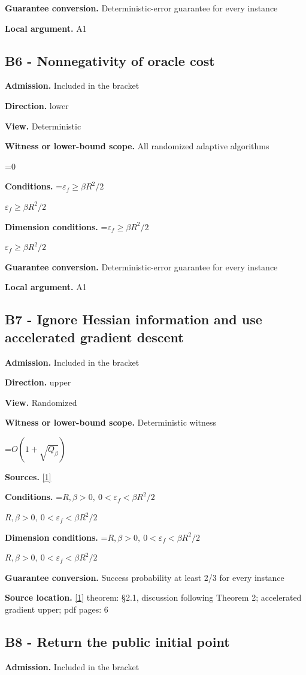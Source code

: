 \documentclass[10pt,a4paper]{article}
\newcommand{\AtlasMath}[1]{\par\begingroup\centering\setbox0=\hbox{$\displaystyle #1$}\ifdim\wd0>1.4\linewidth\typeout{ATLAS WIDE FORMULA: \the\wd0}\fi\ifdim\wd0>\linewidth\resizebox{\linewidth}{!}{\box0}\else\box0\fi\par\endgroup}
\newcommand{\AtlasInlineMath}[1]{\begingroup\setbox0=\hbox{$#1$}\ifdim\wd0>.4\linewidth\endgroup\AtlasMath{#1}\else\endgroup$#1$\fi}
\begin{document}
\textbf{Guarantee conversion.} Deterministic-error guarantee for every instance

\textbf{Local argument.} A1

\subsection{B6 - Nonnegativity of oracle cost}
\textbf{Admission.} Included in the bracket

\textbf{Direction.} lower

\textbf{View.} Deterministic

\textbf{Witness or lower-bound scope.} All randomized adaptive algorithms

\AtlasMath{0}
\textbf{Conditions.} \AtlasInlineMath{\varepsilon_f\ge\beta R^2/2}

\textbf{Dimension conditions.} \AtlasInlineMath{\varepsilon_f\ge\beta R^2/2}

\textbf{Guarantee conversion.} Deterministic-error guarantee for every instance

\textbf{Local argument.} A1

\subsection{B7 - Ignore Hessian information and use accelerated gradient descent}
\textbf{Admission.} Included in the bracket

\textbf{Direction.} upper

\textbf{View.} Randomized

\textbf{Witness or lower-bound scope.} Deterministic witness

\AtlasMath{O(1+\sqrt{Q_\beta})}
\textbf{Sources.} \href{https://arxiv.org/pdf/1705.07260v2}{[1]}

\textbf{Conditions.} \AtlasInlineMath{R,\beta>0,\ 0<\varepsilon_f<\beta R^2/2}

\textbf{Dimension conditions.} \AtlasInlineMath{R,\beta>0,\ 0<\varepsilon_f<\beta R^2/2}

\textbf{Guarantee conversion.} Success probability at least 2/3 for every instance

\textbf{Source location.} \href{https://arxiv.org/pdf/1705.07260v2}{[1]} theorem: §2.1, discussion following Theorem 2; accelerated gradient upper; pdf pages: 6

\subsection{B8 - Return the public initial point}
\textbf{Admission.} Included in the bracket
\end{document}
